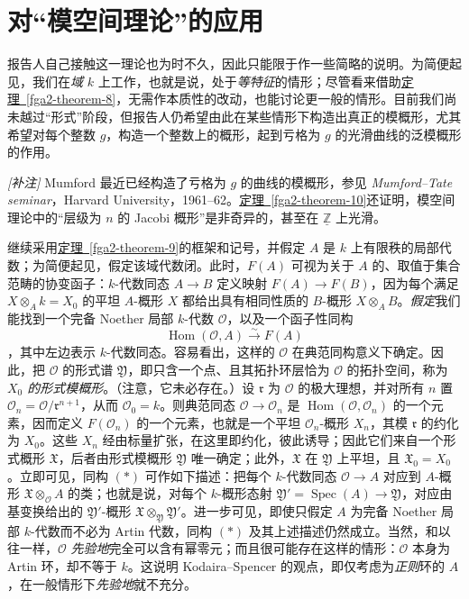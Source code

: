\chapter{对“模空间理论”的应用}\thispagestyle{fancy}\label{fga2-7}
\par{}报告人自己接触这一理论也为时不久，因此只能限于作一些简略的说明。为简便起见，我们在\emph{域} \(k\) 上工作，也就是说，处于\emph{等特征}的情形；尽管看来借助\hyperref[fga2-theorem-8]{定理~\ref*{fga2-theorem-8}}，无需作本质性的改动，也能讨论更一般的情形。目前我们尚未越过“形式”阶段，但报告人仍希望由此在某些情形下构造出真正的模概形，尤其希望对每个整数 \(g\)，构造一个整数上的概形，起到亏格为 \(g\) 的光滑曲线的泛模概形的作用。
\begin{remark}{}\label{fga2-7-remark}\skipsinglepar
\par{}\emph{[补注]} Mumford 最近已经构造了亏格为 \(g\) 的曲线的模概形，参见 \emph{Mumford–Tate seminar}，Harvard University，1961–62。\hyperref[fga2-theorem-10]{定理~\ref*{fga2-theorem-10}}还证明，模空间理论中的“层级为 \(n\) 的 Jacobi 概形”是非奇异的，甚至在 \(\underline {\mathbb {Z}}\) 上光滑。\end{remark}
\par{}继续采用\hyperref[fga2-theorem-9]{定理~\ref*{fga2-theorem-9}}的框架和记号，并假定 \(A\) 是 \(k\) 上有限秩的局部代数；为简便起见，假定该域代数闭。此时，\(F(A)\) 可视为关于 \(A\) 的、取值于集合范畴的协变函子：\(k\)-代数同态 \(A\to  B\) 定义映射 \(F(A)\to  F(B)\)，因为每个满足 \(X\otimes _Ak=X_0\) 的平坦 \(A\)-概形 \(X\) 都给出具有相同性质的 \(B\)-概形 \(X\otimes _AB\)。\emph{假定}我们能找到一个完备 Noether 局部 \(k\)-代数 \(\mathcal {O}\)，以及一个函子性同构 \[     \operatorname {Hom}(\mathcal {O},A) \xrightarrow {\sim } F(A)     \tag{*}   \]，其中左边表示 \(k\)-代数同态。容易看出，这样的 \(\mathcal {O}\) 在典范同构意义下确定。因此，把 \(\mathcal {O}\) 的形式谱 \(\mathfrak {Y}\)，即只含一个点、且其拓扑环层恰为 \(\mathcal {O}\) 的拓扑空间，称为\emph{\(X_0\) 的形式模概形}。（注意，它未必存在。）设 \(\mathfrak {r}\) 为 \(\mathcal {O}\) 的极大理想，并对所有 \(n\) 置 \(\mathcal {O}_n=\mathcal {O} /\mathfrak {r}^{n+1}\)，从而 \(\mathcal {O}_0=k\)。则典范同态 \(\mathcal {O}\to \mathcal {O}_n\) 是 \(\operatorname {Hom}(\mathcal {O},\mathcal {O}_n)\) 的一个元素，因而定义 \(F(\mathcal {O}_n)\) 的一个元素，也就是一个平坦 \(\mathcal {O}_n\)-概形 \(X_n\)，其模 \(\mathfrak {r}\) 的约化为 \(X_0\)。这些 \(X_n\) 经由标量扩张，在这里即约化，彼此诱导；因此它们来自一个形式概形 \(\mathfrak {X}\)，后者由形式模概形 \(\mathfrak {Y}\) 唯一确定；此外，\(\mathfrak {X}\) 在 \(\mathfrak {Y}\) 上平坦，且 \(\mathfrak {X}_0=X_0\)。立即可见，同构 \((*)\) 可作如下描述：把每个 \(k\)-代数同态 \(\mathcal {O}\to  A\) 对应到 \(A\)-概形 \(\mathfrak {X}\otimes _{\mathcal {O}} A\) 的类；也就是说，对每个 \(k\)-概形态射 \(\mathfrak {Y}'=\operatorname {Spec}(A)\to \mathfrak {Y}\)，对应由基变换给出的 \(\mathfrak {Y}'\)-概形 \(\mathfrak {X}\otimes _{\mathfrak {Y}}\mathfrak {Y}'\)。进一步可见，即使只假定 \(A\) 为完备 Noether 局部 \(k\)-代数而不必为 Artin 代数，同构 \((*)\) 及其上述描述仍然成立。当然，和以往一样，\(\mathcal {O}\) \emph{先验地}完全可以含有幂零元；而且很可能存在这样的情形：\(\mathcal {O}\) 本身为 Artin 环，却不等于 \(k\)。这说明 Kodaira–Spencer 的观点，即仅考虑为\emph{正则}环的 \(A\)，在一般情形下\emph{先验地}就不充分。
